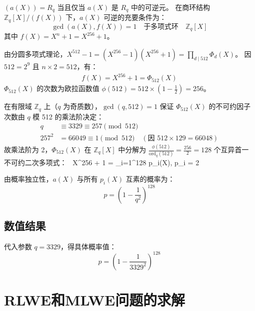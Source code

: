 \documentclass[12pt,a4paper]{article}
\numberwithin{equation}{section}
\begin{document}
$( a(X) ) = R_q$ 当且仅当 $a(X)$ 是 $R_q$ 中的可逆元。
在商环结构 $\mathbb{Z}_q[X]/(f(X))$ 下，$a(X)$ 可逆的充要条件为：
\[
\gcd(a(X), f(X)) = 1 \quad \text{于多项式环} \quad \mathbb{Z}_q[X]
\]
其中 $f(X) = X^n + 1 = X^{256} + 1$。

由分圆多项式理论，$X^{512} - 1 = (X^{256} - 1)(X^{256} + 1) = \prod_{d \mid 512} \Phi_d(X)$。
因 $512 = 2^9$ 且 $n \times 2 = 512$，有：
\begin{align}
f(X) = X^{256} + 1 = \Phi_{512}(X)
\end{align}
$\Phi_{512}(X)$ 的次数为欧拉函数值 $\phi(512) = 512 \times (1 - \frac{1}{2}) = 256$。

在有限域 $\mathbb{Z}_q$ 上（$q$ 为奇质数），$\gcd(q, 512) = 1$ 保证 $\Phi_{512}(X)$ 的不可约因子次数由 $q$ 模 512 的乘法阶决定：
\begin{align*}
q & \equiv 3329 \equiv 257 \pmod{512} \\
257^2 & = 66049 \equiv 1 \pmod{512} \quad (\text{因 } 512 \times 129 = 66048)
\end{align*}
故乘法阶为 2，$\Phi_{512}(X)$ 在 $\mathbb{Z}_q[X]$ 中分解为 $\frac{\phi(512)}{\mathrm{ord}_q(512)} = \frac{256}{2} = 128$ 个互异首一不可约二次多项式：
\
X^{256} + 1 = \prod_{i=1}^{128} p_i(X), \quad \deg p_i = 2
\]

由概率独立性，$a(X)$ 与所有 $p_i(X)$ 互素的概率为：
\begin{equation}
p = \left(1 - \frac{1}{q^2}\right)^{128}
\end{equation}

\subsection{数值结果}
代入参数 $q = 3329$，得具体概率值：
\begin{equation}
p = \left(1 - \frac{1}{3329^2}\right)^{128}
\end{equation}



\section{RLWE和MLWE问题的求解}

\end{document}

